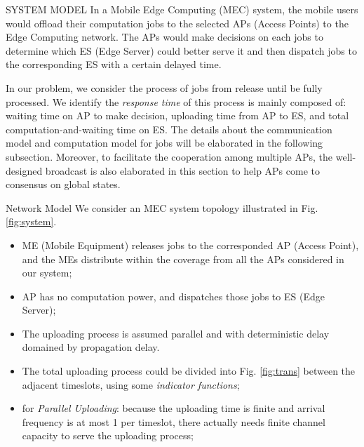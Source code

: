 \documentclass[10pt, conference, letterpaper]{IEEEtran}
\begin{document}
    \begin{section}{SYSTEM MODEL}
        In a Mobile Edge Computing (MEC) system, the mobile users would offload their computation jobs to the selected APs (Access Points) to the Edge Computing network. The APs would make decisions on each jobs to determine which ES (Edge Server) could better serve it and then dispatch jobs to the corresponding ES with a certain delayed time.
            
        In our problem, we consider the process of jobs from release until be fully processed. We identify the \emph{response time} of this process is mainly composed of: waiting time on AP to make decision, uploading time from AP to ES, and total computation-and-waiting time on ES.
        The details about the communication model and computation model for jobs will be elaborated in the following subsection. Moreover, to facilitate the cooperation among multiple APs, the well-designed broadcast is also elaborated in this section to help APs come to consensus on global states.

        \begin{subsection}{Network Model}
            We consider an MEC system topology illustrated in Fig. \ref{fig:system}.

            \begin{itemize}
                \item ME (Mobile Equipment) releases jobs to the corresponded AP (Access Point), and the MEs distribute within the coverage from all the APs considered in our system;
                \item AP has no computation power, and dispatches those jobs to ES (Edge Server);
                \item The uploading process is assumed parallel and with deterministic delay domained by propagation delay.
                \item The total uploading process could be divided into Fig. \ref{fig:trans} between the adjacent timeslots, using some \emph{indicator functions};
                \item for \emph{Parallel Uploading}: because the uploading time is finite and arrival frequency is at most 1 per timeslot, there actually needs finite channel capacity to serve the uploading process;
            \end{itemize}


\end{subsection}
\end{section}
\end{document}
